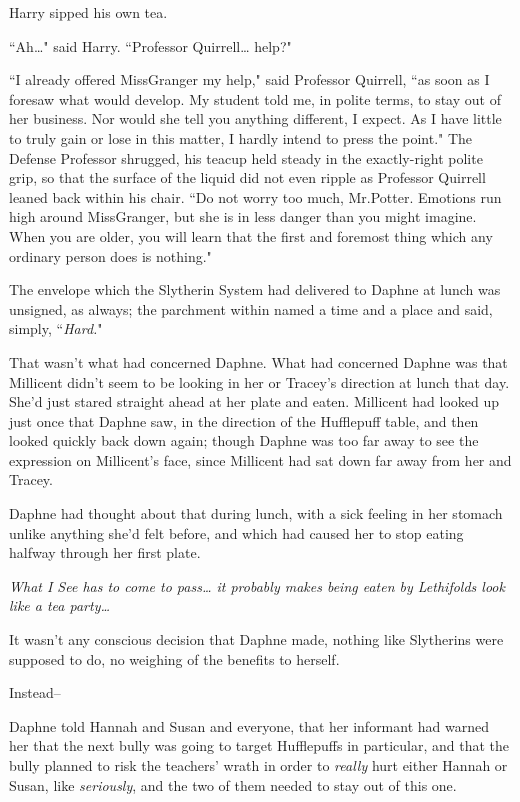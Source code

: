 Harry sipped his own tea.

``Ah{\ldots}" said Harry. ``Professor Quirrell{\ldots} help?"

``I already offered Miss\?Granger my help," said Professor Quirrell, ``as soon as I foresaw what would develop. My student told me, in polite terms, to stay out of her business. Nor would she tell you anything different, I expect. As I have little to truly gain or lose in this matter, I hardly intend to press the point." The Defense Professor shrugged, his teacup held steady in the exactly-right polite grip, so that the surface of the liquid did not even ripple as Professor Quirrell leaned back within his chair. ``Do not worry too much, Mr.\?Potter. Emotions run high around Miss\?Granger, but she is in less danger than you might imagine. When you are older, you will learn that the first and foremost thing which any ordinary person does is nothing."

\later

The envelope which the Slytherin System had delivered to Daphne at lunch was unsigned, as always; the parchment within named a time and a place and said, simply, ``\emph{Hard.}"

That wasn't what had concerned Daphne. What had concerned Daphne was that Millicent didn't seem to be looking in her or Tracey's direction at lunch that day. She'd just stared straight ahead at her plate and eaten. Millicent had looked up just once that Daphne saw, in the direction of the Hufflepuff table, and then looked quickly back down again; though Daphne was too far away to see the expression on Millicent's face, since Millicent had sat down far away from her and Tracey.

Daphne had thought about that during lunch, with a sick feeling in her stomach unlike anything she'd felt before, and which had caused her to stop eating halfway through her first plate.

\emph{What I See has to come to pass{\ldots} it probably makes being eaten by Lethifolds look like a tea party{\ldots}}

It wasn't any conscious decision that Daphne made, nothing like Slytherins were supposed to do, no weighing of the benefits to herself.

Instead\---

Daphne told Hannah and Susan and everyone, that her informant had warned her that the next bully was going to target Hufflepuffs in particular, and that the bully planned to risk the teachers' wrath in order to \emph{really} hurt either Hannah or Susan, like \emph{seriously}, and the two of them needed to stay out of this one.

